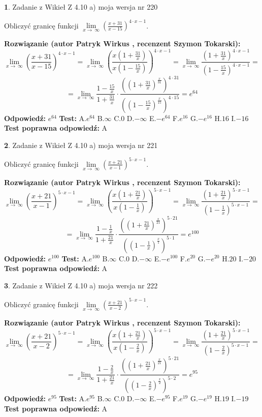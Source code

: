 \documentclass[12pt, a4paper]{article}
\theoremstyle{definition} %
\newtheorem{zad}{}
\newcommand{\zadStart}[1]{\begin{zad}#1\newline}
\newcommand{\zadStop}{\end{zad}}
\newcommand{\rozwStart}[2]{\noindent \textbf{Rozwiązanie (autor #1 , recenzent #2): }\newline}
\newcommand{\rozwStop}{\newline}
\newcommand{\odpStart}{\noindent \textbf{Odpowiedź:}\newline}
\newcommand{\odpStop}{\newline}
\newcommand{\testStart}{\noindent \textbf{Test:}\newline}
\newcommand{\testStop}{\newline}
\newcommand{\kluczStart}{\noindent \textbf{Test poprawna odpowiedź:}\newline}
\newcommand{\kluczStop}{\newline}
\begin{document}
\zadStart{Zadanie z Wikieł Z 4.10 a) moja wersja nr 220}

Obliczyć granicę funkcji  $\lim\limits_{x\to\ \infty}(\frac{x+31}{x-15})^{4\cdot x-1}$.
\zadStop
\rozwStart{Patryk Wirkus}{Szymon Tokarski}
$$\lim\limits_{x\to\ \infty}(\frac{x+31}{x-15})^{4\cdot x-1} = \lim\limits_{x\to\ \infty}(\frac{x(1+\frac{31}{x})}{x(1-\frac{15}{x})})^{4\cdot x-1}=\lim\limits_{x\to\ \infty}\frac{(1+\frac{31}{x})^{4\cdot x-1}}{(1-\frac{15}{x})^{4\cdot x-1}}=$$
$$=\lim\limits_{x\to\ \infty}\frac{1-\frac{15}{x}}{1+\frac{31}{x}}\cdot\frac{((1+\frac{31}{x})^{\frac{x}{31}})^{4\cdot31}}{((1-\frac{15}{x})^{\frac{x}{15}})^{4\cdot15}}=e^{64}$$
\rozwStop
\odpStart
$e^{64}$
\odpStop
\testStart
A.$e^{64}$ B.$\infty$ C.$0$ D.$-\infty$ E.$-e^{64}$
F.$e^{16}$ G.$-e^{16}$
H.$16$
I.$-16$
\testStop
\kluczStart
A
\kluczStop



\zadStart{Zadanie z Wikieł Z 4.10 a) moja wersja nr 221}

Obliczyć granicę funkcji  $\lim\limits_{x\to\ \infty}(\frac{x+21}{x-1})^{5\cdot x-1}$.
\zadStop
\rozwStart{Patryk Wirkus}{Szymon Tokarski}
$$\lim\limits_{x\to\ \infty}(\frac{x+21}{x-1})^{5\cdot x-1} = \lim\limits_{x\to\ \infty}(\frac{x(1+\frac{21}{x})}{x(1-\frac{1}{x})})^{5\cdot x-1}=\lim\limits_{x\to\ \infty}\frac{(1+\frac{21}{x})^{5\cdot x-1}}{(1-\frac{1}{x})^{5\cdot x-1}}=$$
$$=\lim\limits_{x\to\ \infty}\frac{1-\frac{1}{x}}{1+\frac{21}{x}}\cdot\frac{((1+\frac{21}{x})^{\frac{x}{21}})^{5\cdot21}}{((1-\frac{1}{x})^{\frac{x}{1}})^{5\cdot1}}=e^{100}$$
\rozwStop
\odpStart
$e^{100}$
\odpStop
\testStart
A.$e^{100}$ B.$\infty$ C.$0$ D.$-\infty$ E.$-e^{100}$
F.$e^{20}$ G.$-e^{20}$
H.$20$
I.$-20$
\testStop
\kluczStart
A
\kluczStop



\zadStart{Zadanie z Wikieł Z 4.10 a) moja wersja nr 222}

Obliczyć granicę funkcji  $\lim\limits_{x\to\ \infty}(\frac{x+21}{x-2})^{5\cdot x-1}$.
\zadStop
\rozwStart{Patryk Wirkus}{Szymon Tokarski}
$$\lim\limits_{x\to\ \infty}(\frac{x+21}{x-2})^{5\cdot x-1} = \lim\limits_{x\to\ \infty}(\frac{x(1+\frac{21}{x})}{x(1-\frac{2}{x})})^{5\cdot x-1}=\lim\limits_{x\to\ \infty}\frac{(1+\frac{21}{x})^{5\cdot x-1}}{(1-\frac{2}{x})^{5\cdot x-1}}=$$
$$=\lim\limits_{x\to\ \infty}\frac{1-\frac{2}{x}}{1+\frac{21}{x}}\cdot\frac{((1+\frac{21}{x})^{\frac{x}{21}})^{5\cdot21}}{((1-\frac{2}{x})^{\frac{x}{2}})^{5\cdot2}}=e^{95}$$
\rozwStop
\odpStart
$e^{95}$
\odpStop
\testStart
A.$e^{95}$ B.$\infty$ C.$0$ D.$-\infty$ E.$-e^{95}$
F.$e^{19}$ G.$-e^{19}$
H.$19$
I.$-19$
\testStop
\kluczStart
A
\kluczStop
\end{document}
